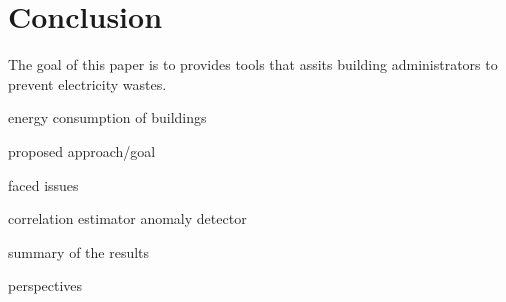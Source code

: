 \section{Conclusion}
The goal of this paper is to provides tools that assits building administrators to prevent electricity wastes.


energy consumption of buildings

proposed approach/goal

faced issues

correlation estimator
anomaly detector

summary of the results

perspectives



